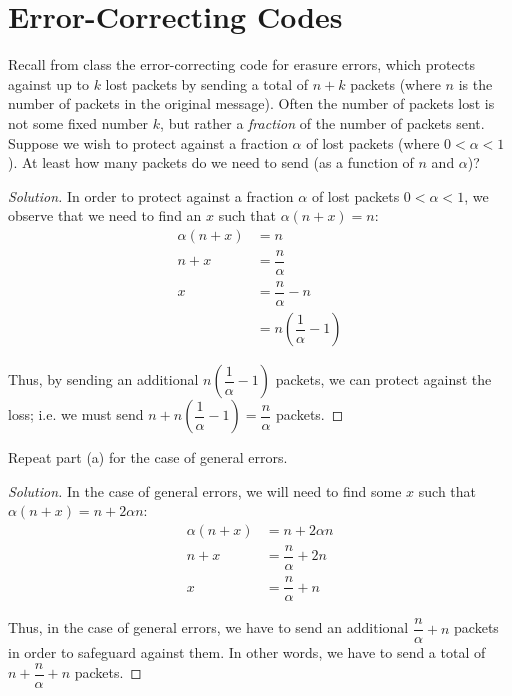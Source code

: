 \documentclass{article}
\newenvironment{solution}{\begin{proof}[Solution]}{\end{proof}}
\begin{document}
\newpage

\section{Error-Correcting Codes}
\begin{hw}
	Recall from class the error-correcting code for erasure errors, which
	protects against up to $k$ lost packets by sending a total of $n+k$ packets
	(where $n$ is the number of packets in the original message).  Often the number
	of packets lost is not some fixed number $k$, but rather a \emph{fraction} of
	the number of packets sent.  Suppose we wish to protect against a fraction
	$\alpha$ of lost packets (where $0 < \alpha < 1$).  At least how many packets do 
	we need to send (as a function of $n$ and $\alpha$)?
\end{hw}
\begin{solution}
	In order to protect against a fraction $\alpha$ of lost packets $0 < \alpha < 1$, we observe that we need to find an $x$ such that $\alpha(n+x) = n$:
	\begin{align*}
		\alpha(n+x) &= n \\
		n + x &= \dfrac{n}{\alpha} \\
		x &= \dfrac{n}{\alpha} - n \\
		&= n(\dfrac{1}{\alpha} - 1)
	\end{align*}

	Thus, by sending an additional $n(\dfrac{1}{\alpha} - 1)$ packets, we can protect against the loss; i.e. we must send $n + n(\dfrac{1}{\alpha} - 1) = \dfrac{n}{\alpha}$ packets.
\end{solution}

\begin{hw}
	Repeat part (a) for the case of general errors.
\end{hw}
\begin{solution}
	In the case of general errors, we will need to find some $x$ such that $\alpha(n+x) = n + 2\alpha n$:
	\begin{align*}
		\alpha(n+x) &= n + 2 \alpha n \\
		n + x &= \dfrac{n}{\alpha} + 2n \\
		x &= \dfrac{n}{\alpha} + n
	\end{align*}

	Thus, in the case of general errors, we have to send an additional $\dfrac{n}{\alpha} + n$ packets in order to safeguard against them. In other words, we have to send a total of $n + \dfrac{n}{\alpha} + n$ packets.
\end{solution}
\end{document}
